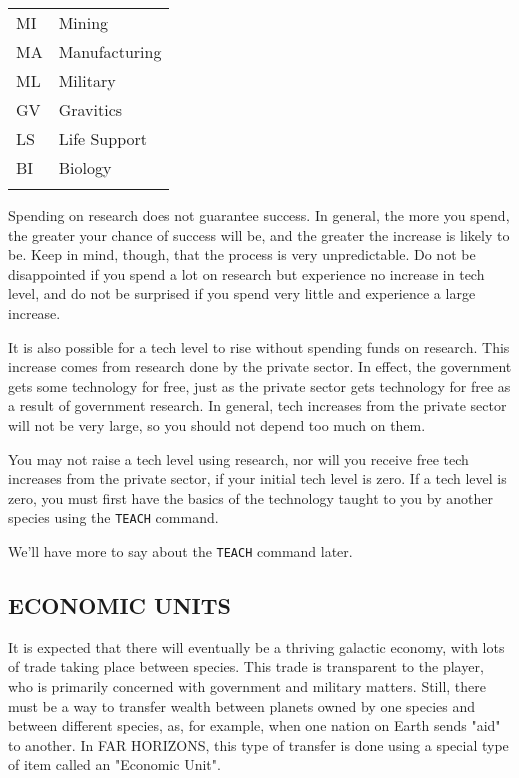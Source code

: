 \documentclass[10pt,titlepage]{article}
\begin{document}
\begin{tabular}{ll}
	MI	&	Mining \\
	MA	&	Manufacturing \\
	ML	&	Military \\
	GV	&	Gravitics \\
	LS	&	Life Support\\
	BI	&	Biology \\ \\
\end{tabular}

Spending on research does not guarantee success.  In general, the more you
spend, the greater your chance of success will be, and the greater the increase
is likely to be.  Keep in mind, though, that the process is very unpredictable.
Do not be disappointed if you spend a lot on research but experience no
increase in tech level, and do not be surprised if you spend very little
and experience a large increase.

It is also possible for a tech level to rise without spending funds on
research.  This increase comes from research done by the private sector.
In effect, the government gets some technology for free, just as the private
sector gets technology for free as a result of government research.  In
general, tech increases from the private sector will not be very large,
so you should not depend too much on them.

\begin{importantnote}
	You may not raise a tech level using research, nor will you
	receive free tech increases from the private sector, if your
	initial tech level is zero.  If a tech level is zero, you
	must first have the basics of the technology taught to you
	by another species using the \texttt{TEACH} command.
\end{importantnote}

\noindent We'll have more to say about the \texttt{TEACH} command later.


\subsection{ECONOMIC UNITS}
\label{sec:economicunits}


It is expected that there will eventually be a thriving galactic economy, with
lots of trade taking place between species.  This trade is transparent to
the player, who is primarily concerned with government and military matters.
Still, there must be a way to transfer wealth between planets owned by one
species and between different species, as, for example, when one nation on
Earth sends "aid" to another.  In FAR HORIZONS, this type of transfer is
done using a special type of item called an "Economic Unit".
\end{document}
